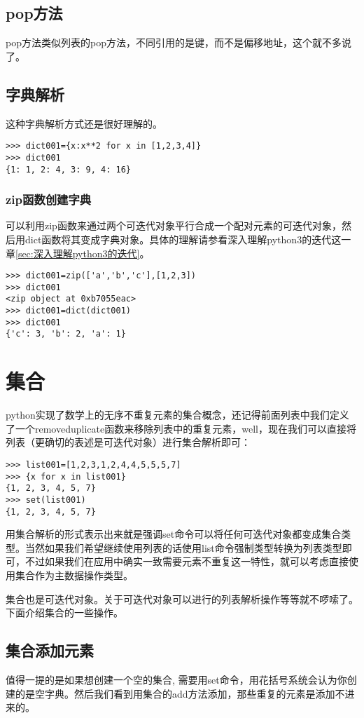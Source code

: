 \documentclass[12pt,oneside]{book}
\begin{document}
\begin{common-format}
\subsection{pop方法}
pop方法类似列表的pop方法，不同引用的是键，而不是偏移地址，这个就不多说了。



\subsection{字典解析}
这种字典解析方式还是很好理解的。
\begin{Verbatim}
>>> dict001={x:x**2 for x in [1,2,3,4]}
>>> dict001
{1: 1, 2: 4, 3: 9, 4: 16}
\end{Verbatim}

\subsubsection{zip函数创建字典}
可以利用zip函数来通过两个可迭代对象平行合成一个配对元素的可迭代对象，然后用dict函数将其变成字典对象。具体的理解请参看深入理解python3的迭代这一章\ref{sec:深入理解python3的迭代}。
\begin{Verbatim}
>>> dict001=zip(['a','b','c'],[1,2,3])
>>> dict001
<zip object at 0xb7055eac>
>>> dict001=dict(dict001)
>>> dict001
{'c': 3, 'b': 2, 'a': 1}
\end{Verbatim}




\section{集合}
python实现了数学上的无序不重复元素的集合概念，还记得前面列表中我们定义了一个removeduplicate函数来移除列表中的重复元素，well，现在我们可以直接将列表（更确切的表述是可迭代对象）进行集合解析即可：

\begin{Verbatim}
>>> list001=[1,2,3,1,2,4,4,5,5,5,7]
>>> {x for x in list001}
{1, 2, 3, 4, 5, 7}
>>> set(list001)
{1, 2, 3, 4, 5, 7}
\end{Verbatim}
用集合解析的形式表示出来就是强调set命令可以将任何可迭代对象都变成集合类型。当然如果我们希望继续使用列表的话使用list命令强制类型转换为列表类型即可，不过如果我们在应用中确实一致需要元素不重复这一特性，就可以考虑直接使用集合作为主数据操作类型。

集合也是可迭代对象。关于可迭代对象可以进行的列表解析操作等等就不啰嗦了。下面介绍集合的一些操作。

\subsection{集合添加元素}
值得一提的是如果想创建一个空的集合, 需要用set命令，用花括号{}系统会认为你创建的是空字典。然后我们看到用集合的add方法添加，那些重复的元素是添加不进来的。


\end{common-format}
\end{document}
